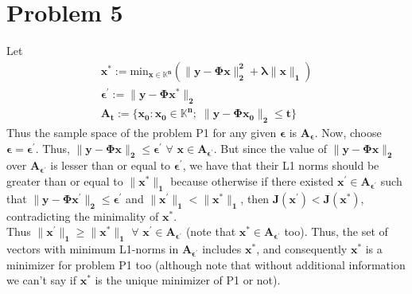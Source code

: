 \documentclass[a4paper,11pt]{article}
\numberwithin{definition}{section}
\numberwithin{mytheorem}{subsection}
\begin{document}
\section{Problem 5}
Let
\begin{gather*}
    \boldsymbol{x^* := \mathrm{min}_{x\in\mathbb{K}^n}(\lVert y-\Phi x\rVert^2_2 + \lambda\lVert x\rVert_1)}\\
    \boldsymbol{\epsilon^{\prime} := \lVert y-\Phi x^*\rVert_2}\\
    \boldsymbol{A_t := \{x_0: x_0 \in \mathbb{K}^n;\;\lVert y-\Phi x_0\rVert_2\leq t\}}
\end{gather*}
Thus the sample space of the problem P1 for any given $\boldsymbol{\epsilon}$ is $\boldsymbol{A_{\epsilon}}$. Now, choose $\boldsymbol{\epsilon = \epsilon^{\prime}}$. Thus, $\boldsymbol{\lVert y-\Phi x\rVert_2 \leq \epsilon^{\prime}}$ $\forall$ $\boldsymbol{x\in A_{\epsilon^{\prime}}}$. But since the value of $\boldsymbol{\lVert y-\Phi x\rVert_2}$ over $\boldsymbol{A_{\epsilon^{\prime}}}$ is lesser than or equal to $\boldsymbol{\epsilon^{\prime}}$, we have that their L1 norms should be greater than or equal to $\boldsymbol{\lVert x^*\rVert_1}$ because otherwise if there existed $\boldsymbol{x^{\prime}\in A_{\epsilon^{\prime}}}$ such that $\boldsymbol{\lVert y-\Phi x^{\prime}\rVert_2 \leq \epsilon^{\prime}}$ and $\boldsymbol{\lVert x^{\prime}\rVert_1 < \lVert x^*\rVert_1}$, then $\boldsymbol{J(x^{\prime}) < J(x^*)}$, contradicting the minimality of $\boldsymbol{x^*}$.\\
Thus $\boldsymbol{\lVert x^{\prime}\rVert_1 \geq \lVert x^{*}\rVert_1}$ $\forall$ $\boldsymbol{x^{\prime}\in A_{\epsilon^{\prime}}}$ (note that $\boldsymbol{x^*\in A_{\epsilon^{\prime}}}$ too). Thus, the set of vectors with minimum L1-norms in $\boldsymbol{A_{\epsilon^{\prime}}}$ includes $\boldsymbol{x^*}$, and consequently $\boldsymbol{x^*}$ is a minimizer for problem P1 too (although note that without additional information we can't say if $\boldsymbol{x^*}$ is the unique minimizer of P1 or not).
\end{document}
